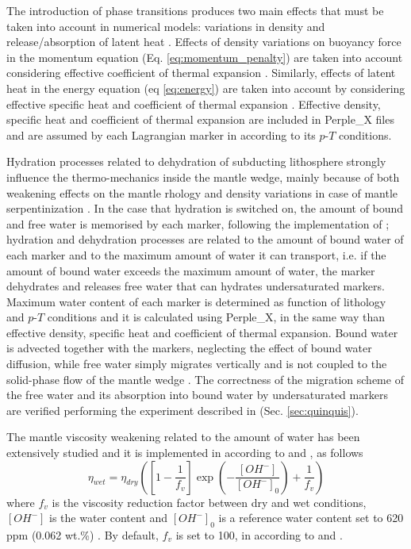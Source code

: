 \documentclass[hidelinks,11pt,a4paper]{article}
\begin{document}
The introduction of phase transitions produces two main effects that must be taken into account in numerical models: variations in density and release/absorption of latent heat \citep{Tackley2010}. Effects of density variations on buoyancy force in the momentum equation (Eq. \ref{eq:momentum_penalty}) are taken into account considering effective coefficient of thermal expansion \citep{Christensen1985,Zhong2015}. Similarly, effects of latent heat in the energy equation (eq \ref{eq:energy}) are taken into account by considering effective specific heat and coefficient of thermal expansion \citep{Christensen1985,Tackley2010,Zhong2015}. Effective density, specific heat and coefficient of thermal expansion are included in Perple\_X files and are assumed by each Lagrangian marker in according to its $p$-$T$ conditions.

Hydration processes related to dehydration of subducting lithosphere \citep{Schmidt1998,Liu2007,Faccenda2009,Faccenda2010,Faccenda2014,Rosas2016} strongly influence the thermo-mechanics inside the mantle wedge, mainly because of both weakening effects on the mantle rhology and density variations in case of mantle serpentinization \citep{Gerya2002,Honda2003,Arcay2005,Roda2010,Regorda2017}. In the case that hydration is switched on, the amount of bound and free water is memorised by each marker, following the implementation of \citet{Quinquis2014}; hydration and dehydration processes are related to the amount of bound water of each marker and to the maximum amount of water it can transport, i.e. if the amount of bound water exceeds the maximum amount of water, the marker dehydrates and releases free water that can hydrates undersaturated markers. Maximum water content of each marker is determined as function of lithology and $p$-$T$ conditions and it is calculated using Perple\_X, in the same way than effective density, specific heat and coefficient of thermal expansion. Bound water is advected together with the markers, neglecting the effect of bound water diffusion, while free water simply migrates vertically and is not coupled to the solid-phase flow of the mantle wedge \citep{Arcay2005,Quinquis2014}. The correctness of the migration scheme of the free water and its absorption into bound water by undersaturated markers are verified performing the experiment described in \citet{Quinquis2014} (Sec. \ref{sec:quinquis}).

The mantle viscosity weakening related to the amount of water has been extensively studied \citep{Chopra1981,Hirth2003} and it is implemented in according to \citet{Arcay2005} and \citet{Horiuchi2016}, as follows
\begin{equation}\label{eq:wet_visc}
\eta_{wet}=\eta_{dry}\left(\left[1-\frac{1}{f_v}\right]\exp\left(-\frac{[OH^-]}{[OH^-]_0}\right)+\frac{1}{f_v}\right)
\end{equation}
where $f_v$ is the viscosity reduction factor between dry and wet conditions, $[OH^-]$ is the water content and $[OH^-]_0$ is a reference water content set to 620 ppm (0.062 wt.\%) \citep{Arcay2005}. By default, $f_v$ is set to 100, in according to \citet{Arcay2005} and \citet{Horiuchi2016}.
\end{document}
